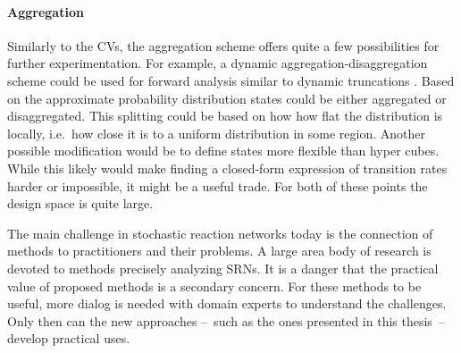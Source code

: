 \paragraph{Aggregation}
Similarly to the \aclp{CV}, the aggregation scheme offers quite a few possibilities for further experimentation.
For example, a dynamic aggregation-disaggregation scheme could be used for forward analysis similar to dynamic truncations \parencite{andreychenko2011parameter}.
Based on the approximate probability distribution states could be either aggregated or disaggregated.
This splitting could be based on how how flat the distribution is locally, i.e.\ how close it is to a uniform distribution in some region.
Another possible modification would be to define states more flexible than hyper cubes.
While this likely would make finding a closed-form expression of transition rates harder or impossible, it might be a useful trade.
For both of these points the design space is quite large.

\vspace{1em}
The main challenge in stochastic reaction networks today is the connection of methods to practitioners and their problems.
A large area body of research is devoted to methods precisely analyzing \acp{SRN}.
It is a danger that the practical value of proposed methods is a secondary concern.
For these methods to be useful, more dialog is needed with domain experts to understand the challenges.
Only then can the new approaches --~such as the ones presented in this thesis~-- develop practical uses.
